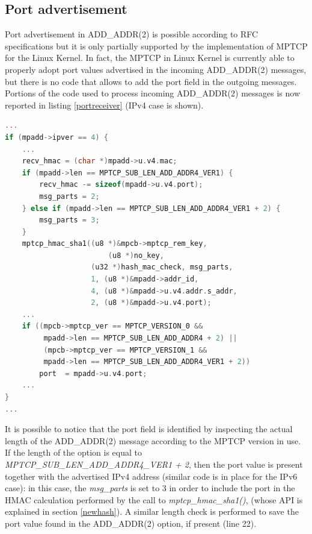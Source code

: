 \subsection{Port advertisement}
\label{portad}
Port advertisement in ADD\_ADDR(2) is possible according to RFC specifications but it is only partially supported by the implementation of MPTCP for the Linux Kernel. In fact, the MPTCP in Linux Kernel is currently able to properly adopt port values advertised in the incoming ADD\_ADDR(2) messages, but there is no code that allows to add the port field in the outgoing messages.
Portions of the code used to process incoming ADD\_ADDR(2) messages is now reported in listing \ref{portreceiver} (IPv4 case is shown).

\begin{lstlisting}[language=c, caption=\textit{Handling port field in ADD\_ADDR2 at the receiver}, label=portreceiver]
...
if (mpadd->ipver == 4) {
    ...
	recv_hmac = (char *)mpadd->u.v4.mac;
	if (mpadd->len == MPTCP_SUB_LEN_ADD_ADDR4_VER1) {
		recv_hmac -= sizeof(mpadd->u.v4.port);
		msg_parts = 2;
	} else if (mpadd->len == MPTCP_SUB_LEN_ADD_ADDR4_VER1 + 2) {
		msg_parts = 3;
	}
	mptcp_hmac_sha1((u8 *)&mpcb->mptcp_rem_key,
	        			(u8 *)no_key,
			      	(u32 *)hash_mac_check, msg_parts,
				    1, (u8 *)&mpadd->addr_id,
				    4, (u8 *)&mpadd->u.v4.addr.s_addr,
				    2, (u8 *)&mpadd->u.v4.port);
	...
	if ((mpcb->mptcp_ver == MPTCP_VERSION_0 &&
	     mpadd->len == MPTCP_SUB_LEN_ADD_ADDR4 + 2) ||
	     (mpcb->mptcp_ver == MPTCP_VERSION_1 &&
	     mpadd->len == MPTCP_SUB_LEN_ADD_ADDR4_VER1 + 2))
		port  = mpadd->u.v4.port;
	...	
}
...
\end{lstlisting}

It is possible to notice that the port field is identified by inspecting the actual length of the ADD\_ADDR(2) message according to the MPTCP version in use. If the length of the option is equal to \textit{MPTCP\_SUB\_LEN\_ADD\_ADDR4\_VER1 + 2}, then the port value is present together with the advertised IPv4 address (similar code is in place for the IPv6 case): in this case, the \textit{msg\_parts} is set to 3 in order to include the port in the HMAC calculation performed by the call to \textit{mptcp\_hmac\_sha1()}, (whose API is explained in section \ref{newhash}). A similar length check is performed to save the port value found in the ADD\_ADDR(2) option, if present (line 22). 

